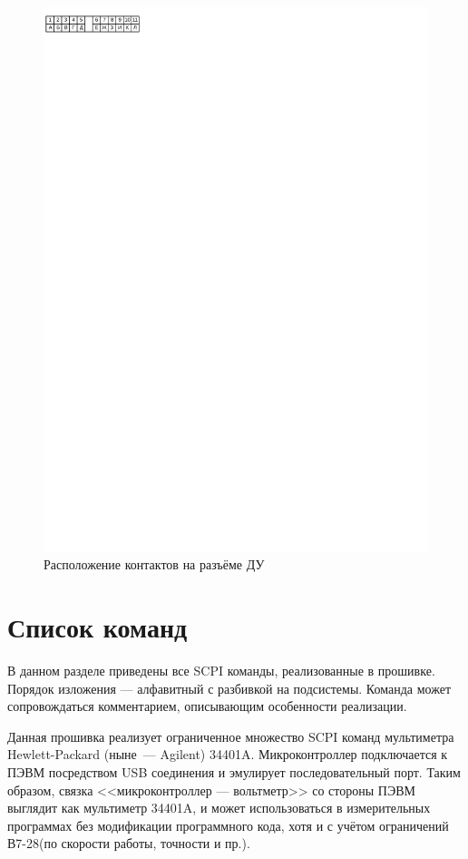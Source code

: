 \documentclass[10pt, a4paper, twocolumn]{article}
\newcommand{\SCPI}{\mbox{SCPI}}
\newcommand{\V}{\mbox{В7-28}}
\begin{document}
\begin{figure}
\begin{center}
\includegraphics[width=\textwidth, clip, viewport=0 800 360 830]{rc-jack}
\end{center}
\caption{Расположение контактов на разъёме ДУ}
\label{pic-rc-jack}
\end{figure}

\section{Список команд}

В данном разделе приведены все \SCPI{} команды, реализованные в прошивке. Порядок изложения --- алфавитный с разбивкой на подсистемы. Команда может сопровождаться комментарием, описывающим особенности реализации.

Данная прошивка реализует ограниченное множество \SCPI{} команд мультиметра Hewlett-Packard (ныне~--- Agilent) \mbox{34401A}. Микроконтроллер подключается к ПЭВМ посредством USB соединения и эмулирует последовательный порт. Таким образом, связка <<микроконтроллер --- вольтметр>> со стороны ПЭВМ выглядит как мультиметр \mbox{34401A}, и может использоваться в измерительных программах без модификации программного кода, хотя и с учётом ограничений \V (по скорости работы, точности и пр.).
\end{document}
